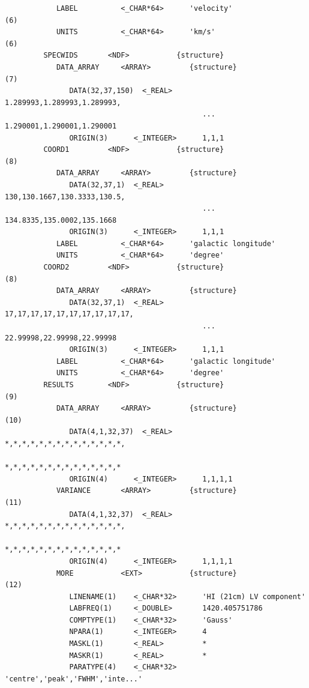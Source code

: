 \documentclass[11pt,twoside]{article}
\begin{document}
\begin{verbatim}
            LABEL          <_CHAR*64>      'velocity'                       (6)
            UNITS          <_CHAR*64>      'km/s'                           (6)
         SPECWIDS       <NDF>           {structure}
            DATA_ARRAY     <ARRAY>         {structure}                      (7)
               DATA(32,37,150)  <_REAL>       1.289993,1.289993,1.289993,
                                              ... 1.290001,1.290001,1.290001
               ORIGIN(3)      <_INTEGER>      1,1,1
         COORD1         <NDF>           {structure}                         (8)
            DATA_ARRAY     <ARRAY>         {structure}
               DATA(32,37,1)  <_REAL>         130,130.1667,130.3333,130.5,
                                              ... 134.8335,135.0002,135.1668
               ORIGIN(3)      <_INTEGER>      1,1,1
            LABEL          <_CHAR*64>      'galactic longitude'
            UNITS          <_CHAR*64>      'degree'
         COORD2         <NDF>           {structure}                         (8)
            DATA_ARRAY     <ARRAY>         {structure}
               DATA(32,37,1)  <_REAL>         17,17,17,17,17,17,17,17,17,17,
                                              ... 22.99998,22.99998,22.99998
               ORIGIN(3)      <_INTEGER>      1,1,1
            LABEL          <_CHAR*64>      'galactic longitude'
            UNITS          <_CHAR*64>      'degree'
         RESULTS        <NDF>           {structure}                         (9)
            DATA_ARRAY     <ARRAY>         {structure}                     (10)
               DATA(4,1,32,37)  <_REAL>       *,*,*,*,*,*,*,*,*,*,*,*,*,*,
                                              *,*,*,*,*,*,*,*,*,*,*,*,*,*
               ORIGIN(4)      <_INTEGER>      1,1,1,1
            VARIANCE       <ARRAY>         {structure}                     (11)
               DATA(4,1,32,37)  <_REAL>       *,*,*,*,*,*,*,*,*,*,*,*,*,*,
                                              *,*,*,*,*,*,*,*,*,*,*,*,*,*
               ORIGIN(4)      <_INTEGER>      1,1,1,1
            MORE           <EXT>           {structure}                     (12)
               LINENAME(1)    <_CHAR*32>      'HI (21cm) LV component'
               LABFREQ(1)     <_DOUBLE>       1420.405751786
               COMPTYPE(1)    <_CHAR*32>      'Gauss'
               NPARA(1)       <_INTEGER>      4
               MASKL(1)       <_REAL>         *
               MASKR(1)       <_REAL>         *
               PARATYPE(4)    <_CHAR*32>      'centre','peak','FWHM','inte...'
\end{verbatim}
\normalsize
\end{document}

